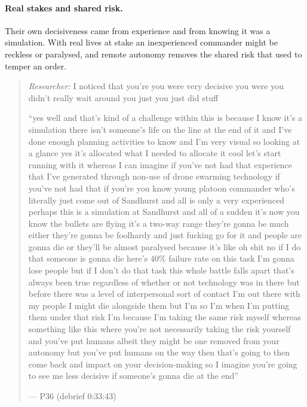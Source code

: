 
\label{sec:qual:practitioner:pt-shared-risk}\paragraph{Real stakes and shared risk.}
Their own decisiveness came from experience and from knowing it was a simulation. With real lives at stake an inexperienced commander might be reckless or paralysed, and remote autonomy removes the shared risk that used to temper an order.

\begin{quote}\small
{\footnotesize\textit{Researcher:} I noticed that you're you were very decisive you were you didn't really wait around you just you just did stuff}\par\smallskip
``yes well and that's kind of a challenge within this is because I know it's a simulation there isn't someone's life on the line at the end of it and I've done enough planning activities to know and I'm very visual so looking at a glance yes it's allocated what I needed to allocate it cool let's start running with it whereas I can imagine if you've not had that experience that I've generated through non-use of drone swarming technology if you've not had that if you're you know young platoon commander who's literally just come out of Sandhurst and all is only a very experienced perhaps this is a simulation at Sandhurst and all of a sudden it's now you know the bullets are flying it's a two-way range they're gonna be much either they're gonna be foolhardy and just fucking go for it and people are gonna die or they'll be almost paralysed because it's like oh shit no if I do that someone is gonna die here's 40\% failure rate on this task I'm gonna lose people but if I don't do that task this whole battle falls apart that's always been true regardless of whether or not technology was in there but before there was a level of interpersonal sort of contact I'm out there with my people I might die alongside them but I'm so I'm when I'm putting them under that risk I'm because I'm taking the same risk myself whereas something like this where you're not necessarily taking the risk yourself and you've put humans albeit they might be one removed from your autonomy but you've put humans on the way then that's going to then come back and impact on your decision-making so I imagine you're going to see me less decisive if someone's gonna die at the end''\par\hfill--- P36 (debrief 0:33:43)
\end{quote}

